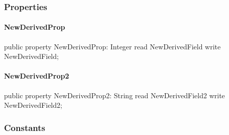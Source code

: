 \documentclass{report}
\begin{document}
\subsubsection*{\large{\textbf{Properties}}\normalsize\hspace{1ex}\hfill}
\paragraph*{NewDerivedProp}\hspace*{\fill}

\begin{list}{}{
\setlength{\itemindent}{0cm}
\setlength{\listparindent}{0cm}
\setlength{\leftmargin}{\evensidemargin}
\addtolength{\leftmargin}{\tmplength}
\settowidth{\labelsep}{X}
\addtolength{\leftmargin}{\labelsep}
\setlength{\labelwidth}{\tmplength}
}
\begin{flushleft}
\item[\textbf{Declaration}\hfill]
\begin{ttfamily}
public property NewDerivedProp: Integer read NewDerivedField write NewDerivedField;\end{ttfamily}


\end{flushleft}
\end{list}
\paragraph*{NewDerivedProp2}\hspace*{\fill}

\begin{list}{}{
\setlength{\itemindent}{0cm}
\setlength{\listparindent}{0cm}
\setlength{\leftmargin}{\evensidemargin}
\addtolength{\leftmargin}{\tmplength}
\settowidth{\labelsep}{X}
\addtolength{\leftmargin}{\labelsep}
\setlength{\labelwidth}{\tmplength}
}
\begin{flushleft}
\item[\textbf{Declaration}\hfill]
\begin{ttfamily}
public property NewDerivedProp2: String read NewDerivedField2 write NewDerivedField2;\end{ttfamily}


\end{flushleft}
\end{list}
\subsubsection*{\large{\textbf{Constants}}\normalsize\hspace{1ex}\hfill}
\end{document}
